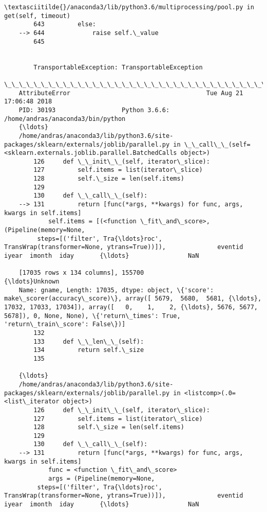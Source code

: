 \documentclass[11pt]{article}
\begin{document}
\begin{Verbatim}[commandchars=\\\{\}]
        \textasciitilde{}/anaconda3/lib/python3.6/multiprocessing/pool.py in get(self, timeout)
        643         else:
    --> 644             raise self.\_value
        645 


        TransportableException: TransportableException
    \_\_\_\_\_\_\_\_\_\_\_\_\_\_\_\_\_\_\_\_\_\_\_\_\_\_\_\_\_\_\_\_\_\_\_\_\_\_\_\_\_\_\_\_\_\_\_\_\_\_\_\_\_\_\_\_\_\_\_\_\_\_\_\_\_\_\_\_\_\_\_\_\_\_\_
    AttributeError                                     Tue Aug 21 17:06:48 2018
    PID: 30193                  Python 3.6.6: /home/andras/anaconda3/bin/python
    {\ldots}
    /home/andras/anaconda3/lib/python3.6/site-packages/sklearn/externals/joblib/parallel.py in \_\_call\_\_(self=<sklearn.externals.joblib.parallel.BatchedCalls object>)
        126     def \_\_init\_\_(self, iterator\_slice):
        127         self.items = list(iterator\_slice)
        128         self.\_size = len(self.items)
        129 
        130     def \_\_call\_\_(self):
    --> 131         return [func(*args, **kwargs) for func, args, kwargs in self.items]
            self.items = [(<function \_fit\_and\_score>, (Pipeline(memory=None,
         steps=[('filter', Tra{\ldots}roc', TransWrap(transformer=None, ytrans=True))]),              eventid  iyear  imonth  iday       {\ldots}                NaN  
    
    [17035 rows x 134 columns], 155700                                          {\ldots}Unknown
    Name: gname, Length: 17035, dtype: object, \{'score': make\_scorer(accuracy\_score)\}, array([ 5679,  5680,  5681, {\ldots}, 17032, 17033, 17034]), array([   0,    1,    2, {\ldots}, 5676, 5677, 5678]), 0, None, None), \{'return\_times': True, 'return\_train\_score': False\})]
        132 
        133     def \_\_len\_\_(self):
        134         return self.\_size
        135 
    
    {\ldots}
    /home/andras/anaconda3/lib/python3.6/site-packages/sklearn/externals/joblib/parallel.py in <listcomp>(.0=<list\_iterator object>)
        126     def \_\_init\_\_(self, iterator\_slice):
        127         self.items = list(iterator\_slice)
        128         self.\_size = len(self.items)
        129 
        130     def \_\_call\_\_(self):
    --> 131         return [func(*args, **kwargs) for func, args, kwargs in self.items]
            func = <function \_fit\_and\_score>
            args = (Pipeline(memory=None,
         steps=[('filter', Tra{\ldots}roc', TransWrap(transformer=None, ytrans=True))]),              eventid  iyear  imonth  iday       {\ldots}                NaN  
    

\end{Verbatim}
\end{document}
